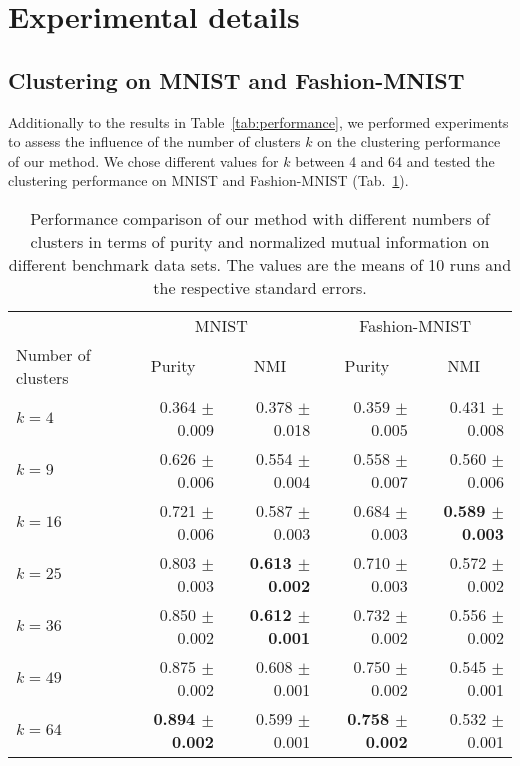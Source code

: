 \section{Experimental details}


\subsection{Clustering on MNIST and Fashion-MNIST} \label{sec:mnist_appendix}

Additionally to the results in Table~\ref{tab:performance}, we performed experiments to assess the influence of the number of clusters $k$ on the clustering performance of our method.
We chose different values for $k$ between 4 and 64 and tested the clustering performance on MNIST and Fashion-MNIST (Tab.~\ref{tab:k_performance}).

\begin{table}
    \centering
    \caption{Performance comparison of our method with different numbers of clusters in terms of purity and normalized mutual information on different benchmark data sets. The values are the means of 10 runs and the respective standard errors.}
    \begin{tabular}{lrrrr}
        \toprule
         & \multicolumn{2}{c}{MNIST} & \multicolumn{2}{c}{Fashion-MNIST} \\
        \cmidrule(rl){2-3}
        \cmidrule(rl){4-5}
        Number of clusters & \multicolumn{1}{c}{Purity} & \multicolumn{1}{c}{NMI} & \multicolumn{1}{c}{Purity} & \multicolumn{1}{c}{NMI} \\
         \midrule
         $k = 4$ & 0.364 $\pm$ 0.009 & 0.378 $\pm$ 0.018 & 0.359 $\pm$ 0.005 & 0.431 $\pm$ 0.008\\
         $k = 9$ & 0.626 $\pm$ 0.006 & 0.554 $\pm$ 0.004 & 0.558 $\pm$ 0.007 & 0.560 $\pm$ 0.006\\
         $k = 16$ & 0.721 $\pm$ 0.006 & 0.587 $\pm$ 0.003 & 0.684 $\pm$ 0.003 & \textbf{0.589 $\pm$ 0.003}\\
         $k = 25$ & 0.803 $\pm$ 0.003 & \textbf{0.613 $\pm$ 0.002} & 0.710 $\pm$ 0.003 & 0.572 $\pm$ 0.002\\
         $k = 36$ & 0.850 $\pm$ 0.002 & \textbf{0.612 $\pm$ 0.001} & 0.732 $\pm$ 0.002 & 0.556 $\pm$ 0.002\\
         $k = 49$ & 0.875 $\pm$ 0.002 & 0.608 $\pm$ 0.001 & 0.750 $\pm$ 0.002 & 0.545 $\pm$ 0.001\\
         $k = 64$ & \textbf{0.894 $\pm$ 0.002} & 0.599 $\pm$ 0.001 & \textbf{0.758 $\pm$ 0.002} & 0.532 $\pm$ 0.001\\
         \bottomrule
    \end{tabular}
    \label{tab:k_performance}
\end{table}

